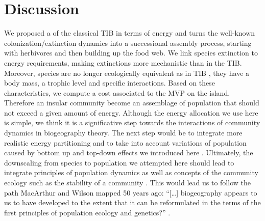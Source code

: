 \section{Discussion}\label{discussion}

We proposed a of the classical TIB in terms of energy and turns the
well-known colonization/extinction dynamics into a successional assembly
process, starting with herbivores and then building up the food web. We
link species extinction to energy requirements, making extinctions more
mechanistic than in the TIB. Moreover, species are no longer
ecologically equivalent as in TIB \citep{Lomolino2009}, they have a body
mass, a trophic level and specific interactions. Based on these
characteristics, we compute a cost associated to the MVP on the island.
Therefore an insular community become an assemblage of population that
should not exceed a given amount of energy. Although the energy
allocation we use here is simple, we think it is a significative step
towards the interactions of community dynamics in biogeography theory.
The next step would be to integrate more realistic energy partitioning
\citep{DeRuiter1995} and to take into account variations of population
caused by bottom up and top-down effects we introduced here
\citep{Terborgh2001, Brown2013}. Ultimately, the downscaling from
species to population we attempted here should lead to integrate
principles of population dynamics as well as concepts of the community
ecology such as the stability of a community \citep{Allesina2012a}. This
would lead us to follow the path MacArthur and Wilson mapped 50 years
ago: ``{[}\ldots{}{]} biogeography appears to us to have developed to
the extent that it can be reformulated in the terms of the first
principles of population ecology and genetics?''
\citep[p.183]{MacArthur1967}.

